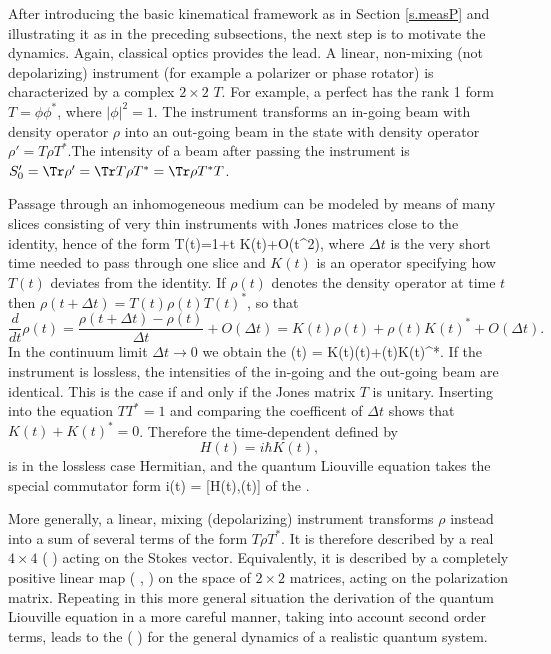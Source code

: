 \documentclass[12pt]{article}
\begin{document}
After introducing the basic kinematical framework as in Section 
\ref{s.measP} and illustrating it as in the preceding subsections, the 
next step is to motivate the dynamics. Again, classical optics provides 
the lead.
A linear, non-mixing (not depolarizing) instrument (for example a
polarizer or phase rotator) is characterized by a complex $2\times 2$
 $T$. For example, a perfect  has 
the rank 1 form $T=\phi\phi^*$, where $|\phi|^2=1$. 
The instrument transforms an in-going beam with density operator $\rho$
into an out-going beam in the state with density operator 
$\rho'=T\rho T^*$.The intensity of a beam after passing the instrument 
is $S_0'=\Tr \rho'=\Tr T\rho T^*=\Tr \rho T^*T$. 

Passage through an inhomogeneous medium can be modeled by means of many
slices consisting of very thin instruments with Jones matrices close to 
the identity, hence of the form
T(t)=1+\Delta t K(t)+O(\Delta t^2),
\eeq
where $\Delta t$ is the very short time needed to pass through one 
slice and $K(t)$ is an operator specifying how $T(t)$ deviates from the 
identity. If $\rho(t)$ denotes the density operator at time $t$ then
$\rho(t+\Delta t) = T(t)\rho(t)T(t)^*$, so that 
\[
\frac{d}{dt}\rho(t)
= \frac{\rho(t+\Delta t)-\rho(t)}{\Delta t}+O(\Delta t)
= K(t)\rho(t)+\rho(t)K(t)^*+O(\Delta t).
\]
In the continuum limit $\Delta t\to 0$ we obtain the 
\rho(t) = K(t)\rho(t)+\rho(t)K(t)^*.
\eeq
If the instrument is lossless, the intensities of the in-going and the 
out-going beam are identical. This is the case if and only if the Jones 
matrix $T$ is unitary. Inserting  into the equation $TT^*=1$
and comparing the coefficent of $\Delta t$ shows that $K(t)+K(t)^*=0$. 
Therefore the time-dependent  defined by
\[
H(t)=i\hbar K(t),
\]
is in the lossless case Hermitian, and the quantum Liouville equation
takes the special commutator form 
i\hbar{}\rho(t) = [H(t),\rho(t)]
\eeq
of the .

More generally, a linear, mixing (depolarizing) instrument transforms 
$\rho$ instead into a sum of several terms of the form $T\rho T^*$.
It is therefore described by a real $4\times 4$ 
( \cite{PerO}) acting on the Stokes vector.
Equivalently, it is described by a completely positive linear map 
( \cite{Kos},  \cite{Choi}) on the space of 
$2\times 2$ matrices, acting on the polarization matrix. Repeating in
this more general situation the derivation of the quantum Liouville 
equation in a more careful manner, taking into account second order 
terms, leads to the  ( \cite{Lin}) 
for the general dynamics of a realistic quantum system.
\end{document}
